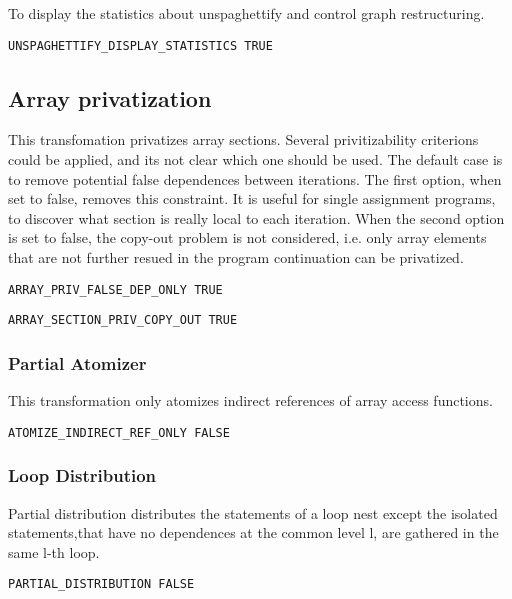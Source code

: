 To display the statistics about unspaghettify and control graph
restructuring.
\begin{verbatim}
UNSPAGHETTIFY_DISPLAY_STATISTICS TRUE
\end{verbatim}


\subsection{Array privatization}

This transfomation privatizes array sections. Several privitizability
criterions could be applied, and its not clear which one should be used. The
default case is to remove potential false dependences between
iterations. The first option, when set to false, removes this
constraint. It is useful for single assignment programs, to discover what
section is really local to each iteration. When the second option is set to
false, the copy-out problem is not considered, i.e. only array elements that
are not further resued in the program continuation can be privatized. 

\begin{verbatim}
ARRAY_PRIV_FALSE_DEP_ONLY TRUE
\end{verbatim}

\begin{verbatim}
ARRAY_SECTION_PRIV_COPY_OUT TRUE
\end{verbatim}

\subsubsection{Partial Atomizer}

This transformation only atomizes indirect references of array access
functions.

\begin{verbatim}
ATOMIZE_INDIRECT_REF_ONLY FALSE
\end{verbatim}

\subsubsection{Loop Distribution}

Partial distribution distributes the statements of a loop nest except
 the isolated statements,that have no dependences at the common level l,
 are gathered in the same l-th loop.

\begin{verbatim}
PARTIAL_DISTRIBUTION FALSE
\end{verbatim}

